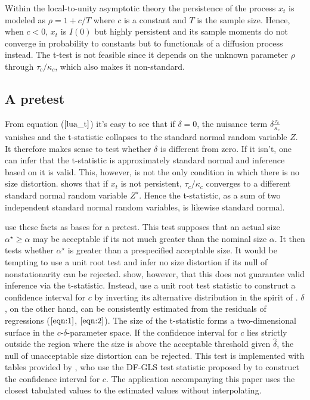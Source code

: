 \documentclass{article}
\begin{document}
Within the local-to-unity asymptotic theory the persistence of the process $x_{t}$ is modeled as $\rho=1+c / T$ where $c$ is a constant and $T$ is the sample size. Hence, when $c<0$, $x_{t}$ is $I(0)$ but highly persistent and its sample moments do not converge in probability to constants but to functionals of a diffusion process instead. The t-test is not feasible since it depends on the unknown parameter $\rho$ through $\tau_{c} / \kappa_{c}$, which also makes it non-standard. 

\subsection{A pretest}
\label{pretest}
From equation ($\ref{lua_t}$) it's easy to see that if $\delta = 0$, the nuisance term $\delta \frac{\tau_{c}}{\kappa_{c}}$ vanishes and the t-statistic collapses to the standard normal random variable $Z$. It therefore makes sense to test whether $\delta$ is different from zero. If it isn't, one can infer that the t-statistic is approximately standard normal and inference based on it is valid. This, however, is not the only condition in which there is no size distortion. \citet{phillips1987towards} shows that if $x_{t}$ is not persistent, $\tau_{c} / \kappa_{c}$ converges to a different standard normal random variable $Z^{\star}$. Hence the t-statistic, as a sum of two independent standard normal random variables, is likewise standard normal. 

\citet{campbell2006efficient} use these facts as bases for a pretest. This test supposes that an actual size $\alpha^{\star}  \geq \alpha$ may be acceptable if its not much greater than the nominal size $\alpha$. It then tests whether $\alpha^{\star}$ is greater than a prespecified acceptable size. It would be tempting to use a unit root test and infer no size distortion if its null of nonstationarity can be rejected. \citet{elliott1994inference} show, however, that this does not guarantee valid inference via the t-statistic. Instead, \citet{campbell2006efficient} use a unit root test statistic to construct a confidence interval for $c$ by inverting its alternative distribution in the spirit of \citet{stock1991confidence}. $\delta$, on the other hand, can be consistently estimated from the residuals of regressions ($\ref{eqn:1}$, $\ref{eqn:2}$). The size of the t-statistic forms a two-dimensional surface in the $c$-$\delta$-parameter space. If the confidence interval for $c$ lies strictly outside the region where the size is above the acceptable threshold given $\hat{\delta}$, the null of unacceptable size distortion can be rejected. This test is implemented with tables provided by \citet{campbell2006efficient}, who use the DF-GLS test statistic proposed by \citet{elliott1996efficient} to construct the confidence interval for $c$. The application accompanying this paper uses the closest tabulated values to the estimated values without interpolating.
\end{document}
